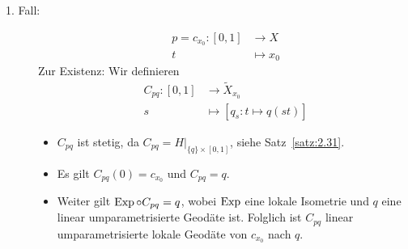 \begin{beweis}
	\begin{description}
		\item[1. Fall:] \begin{align*}
			p = c_{x_0}\colon [0,1] &\longrightarrow X \\
			t &\longmapsto x_0
		\end{align*} 
		Zur Existenz: Wir definieren
		\begin{align*}
			C_{pq}\colon [0,1] &\longrightarrow \tilde{X}_{x_0} \\
			s &\longmapsto [q_s \colon t \mapsto q(st)]
		\end{align*}
		\begin{itemize}
			\item $C_{pq}$ ist stetig, da $C_{pq} = H \big|_{\{q\} \times [0,1]}$, siehe Satz~\ref{satz:2.31}.
			\item Es gilt $C_{pq}(0) = c_{x_0}$ und $C_{pq} = q$.
			\item Weiter gilt $\operatorname{Exp} \circ C_{pq} = q$, wobei $\operatorname{Exp}$ eine lokale Isometrie und $q$ eine linear umparametrisierte Geodäte ist.
			Folglich ist $C_{pq}$ linear umparametrisierte lokale Geodäte von $c_{x_0}$ nach $q.$
		\end{itemize}
		

\end{description}
\end{beweis}
